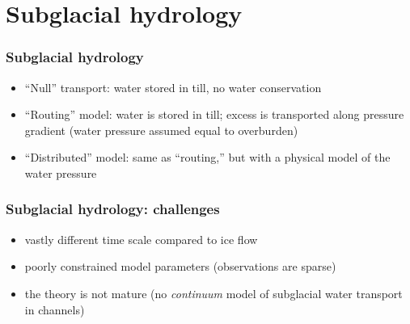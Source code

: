 \documentclass[hide notes,intlimits]{beamer}
\begin{document}
\section{Subglacial hydrology}
\label{sec:subglacial-hydrology}

\begin{frame}
  \frametitle{Subglacial hydrology}

  \begin{itemize}
  \item ``Null'' transport: water stored in till, no water conservation
  \item ``Routing'' model: water is stored in till; excess is
    transported along pressure gradient (water pressure assumed equal
    to overburden)
  \item ``Distributed'' model: same as ``routing,'' but with a
    physical model of the water pressure
  \end{itemize}
\end{frame}

\begin{frame}
  \frametitle{Subglacial hydrology: challenges}

  \begin{itemize}
  \item vastly different time scale compared to ice flow
  \item poorly constrained model parameters (observations are sparse)
  \item the theory is not mature (no \emph{continuum} model of
    subglacial water transport in channels)
  \end{itemize}
\end{frame}

\end{document}
